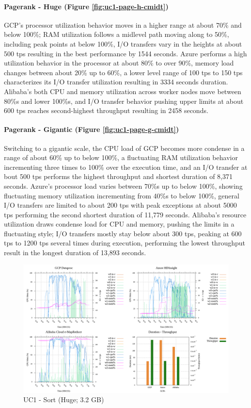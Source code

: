 \documentclass[review]{elsarticle}
\begin{document}
\paragraph{Pagerank - Huge (Figure \ref{fig:uc1-page-h-cmidt})}GCP's processor utilization behavior moves in a higher range at about 70\% and below 100\%; RAM utilization follows a midlevel path moving along to 50\%, including peak points at below 100\%, I/O transfers vary in the heights at about 500 tps resulting in the best performance by 1544 seconds. Azure performs a high utilization behavior in the processor at about 80\% to over 90\%, memory load changes between about 20\% up to 60\%, a lower level range of 100 tps to 150 tps characterizes its I/O transfer utilization resulting in 3334 seconds duration. Alibaba's both CPU and memory utilization across worker nodes move between 80\%s and lower 100\%s, and I/O transfer behavior pushing upper limits at about 600 tps reaches second-highest throughput resulting in 2458 seconds.

\paragraph{Pagerank - Gigantic (Figure \ref{fig:uc1-page-g-cmidt})}Switching to a gigantic scale, the CPU load of GCP becomes more condense in a range of about 60\% up to below 100\%, a fluctuating RAM utilization behavior incrementing three times to 100\% over the execution time, and an I/O transfer at bout 500 tps performs the highest throughput and shortest duration of 8,371 seconds. Azure's processor load varies between 70\%s up to below 100\%, showing fluctuating memory utilization incrementing from 40\%s to below 100\%, general I/O transfers are limited to about 200 tps with peak exceptions at about 5000 tps performing the second shortest duration of 11,779 seconds. Alibaba's resource utilization draws condense load for CPU and memory, pushing the limits in a fluctuating style; I/O transfers mostly stay below about 300 tps, peaking at 600 tps to 1200 tps several times during execution, performing the lowest throughput result in the longest duration of 13,893 seconds.

\begin{figure}[p]
	\caption{UC1 - Sort (Huge; 3.2 GB)}
	\label{fig:uc1-srt-h-cmidt}
	\includegraphics[width=\textwidth]{uc1-srt-h-cmidt}
	\centering
\end{figure}
\end{document}
